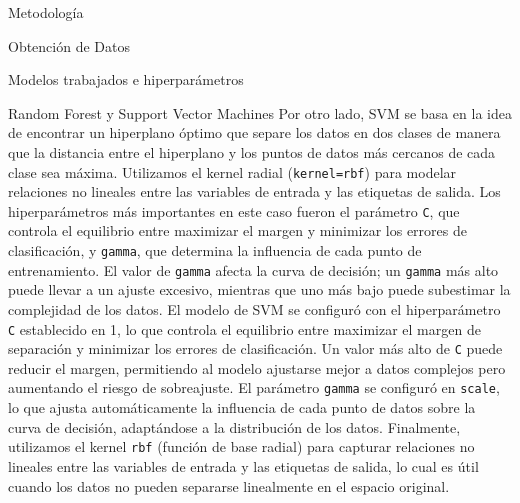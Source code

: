 \documentclass[11pt]{article}
\begin{document}
\begin{section}{Metodología}
\begin{subsection}{Obtención de Datos}
\begin{subsection}{Modelos trabajados e hiperparámetros}
\begin{subsubsection}{Random Forest y Support Vector Machines}
Por otro lado, SVM se basa en la idea de encontrar un hiperplano óptimo que separe los datos en dos clases de manera que la distancia entre el hiperplano y los puntos de datos más cercanos de cada clase sea máxima. Utilizamos el kernel radial (\texttt{kernel=rbf}) para modelar relaciones no lineales entre las variables de entrada y las etiquetas de salida. Los hiperparámetros más importantes en este caso fueron el parámetro \texttt{C}, que controla el equilibrio entre maximizar el margen y minimizar los errores de clasificación, y \texttt{gamma}, que determina la influencia de cada punto de entrenamiento. El valor de \texttt{gamma} afecta la curva de decisión; un \texttt{gamma} más alto puede llevar a un ajuste excesivo, mientras que uno más bajo puede subestimar la complejidad de los datos. El modelo de SVM se configuró con el hiperparámetro \texttt{C} establecido en 1, lo que controla el equilibrio entre maximizar el margen de separación y minimizar los errores de clasificación. Un valor más alto de \texttt{C} puede reducir el margen, permitiendo al modelo ajustarse mejor a datos complejos pero aumentando el riesgo de sobreajuste. El parámetro \texttt{gamma} se configuró en \texttt{scale}, lo que ajusta automáticamente la influencia de cada punto de datos sobre la curva de decisión, adaptándose a la distribución de los datos. Finalmente, utilizamos el kernel \texttt{rbf} (función de base radial) para capturar relaciones no lineales entre las variables de entrada y las etiquetas de salida, lo cual es útil cuando los datos no pueden separarse linealmente en el espacio original.

\end{subsubsection}


\end{subsection}
\end{subsection}
\end{section}
\end{document}
